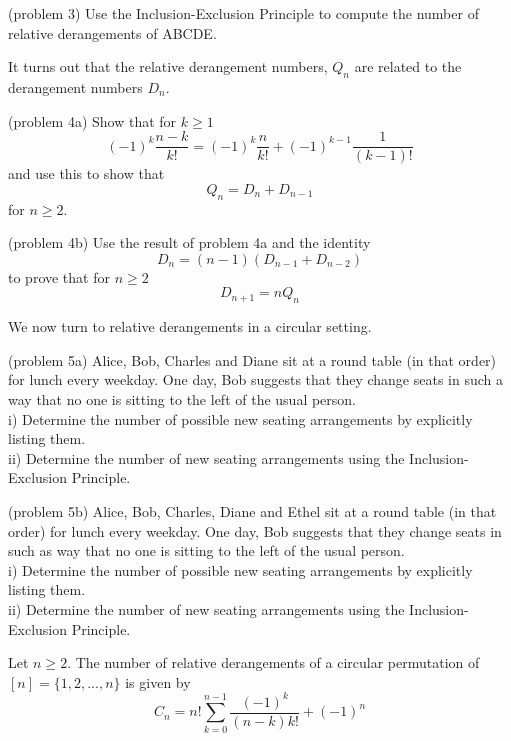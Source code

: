 \documentclass[handout]{ximera}
\begin{document}
\begin{problem}(problem 3) Use the Inclusion-Exclusion Principle to compute the number of relative derangements of ABCDE.
\end{problem}

It turns out that the relative derangement numbers, $Q_n$ are related to the derangement numbers $D_n$.

\begin{problem}(problem 4a)  Show that for $k \geq 1$
\[
(-1)^k \frac{n-k}{k!} = (-1)^k \frac{n}{k!} + (-1)^{k-1} \frac{1}{(k-1)!}
\]
and use this to show that 
\[
Q_n = D_n + D_{n-1}
\]
for $n \geq 2$.
\end{problem}


\begin{problem}(problem 4b) Use the result of problem 4a and the identity 
\[
D_n = (n-1)(D_{n-1} + D_{n-2})
\]
 to prove that for $n \geq 2$
\[
D_{n+1} = nQ_n
\]
\end{problem}

We now turn to relative derangements in a circular setting.

\begin{problem}(problem 5a)
Alice, Bob, Charles and Diane sit at a round table (in that order) for lunch every weekday. One day, Bob suggests 
that they change seats in such a way that no one is sitting to the left of the usual person.\\
i) Determine the number of possible new seating arrangements by explicitly listing them. \\
ii) Determine the number of new seating arrangements using the Inclusion-Exclusion Principle.
\end{problem}

\begin{problem}(problem 5b)
Alice, Bob, Charles, Diane and Ethel sit at a round table (in that order) for lunch every weekday. One day, Bob suggests 
that they change seats in such as way that no one is sitting to the left of the usual person.\\
i) Determine the number of possible new seating arrangements by explicitly listing them. \\
ii) Determine the number of new seating arrangements using the Inclusion-Exclusion Principle.
\end{problem}

\begin{proposition}
Let $n \geq 2$. The number of relative derangements of a circular permutation of $[n] = \{1, 2, ..., n\}$ is given by
\[
C_n = n!\sum_{k=0}^{n-1} \frac{(-1)^k}{(n-k)k!} + (-1)^n
\]
\end{proposition}
\end{document}
